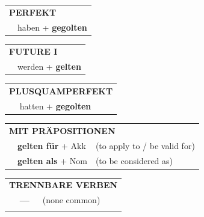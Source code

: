 \documentclass[10pt,a4paper]{revtex4-2}
\begin{document}
\begin{verbbox}
 \begin{tabular}{rl}
     \multicolumn{2}{l}{\textbf{PERFEKT}}\\
   & haben + \textbf{gegolten}\\
  \end{tabular}
\hfill
   \begin{tabular}{rl}
    \multicolumn{2}{l}{\textbf{FUTURE I} }\\
   & werden + \textbf{gelten}\\
  \end{tabular}
\hfill
   \begin{tabular}{rl}
      \multicolumn{2}{l}{\textbf{PLUSQUAMPERFEKT}}\\
   & hatten + \textbf{gegolten}\\
  \end{tabular}

   \vspace{10pt}

   \begin{tabular}{lll}
      \multicolumn{3}{l}{\textbf{MIT PRÄPOSITIONEN}}\\
& \textbf{gelten für} + Akk & (to apply to / be valid for)\\
& \textbf{gelten als} + Nom & (to be considered as)\\
\end{tabular}
  \hfill
   \begin{tabular}{lll}
      \multicolumn{3}{l}{\textbf{TRENNBARE VERBEN}}\\
 & \textbf{---} & (none common)\\
\vspace{10pt}
  \end{tabular}

  \vspace{-5pt}

\end{verbbox}
\end{document}

